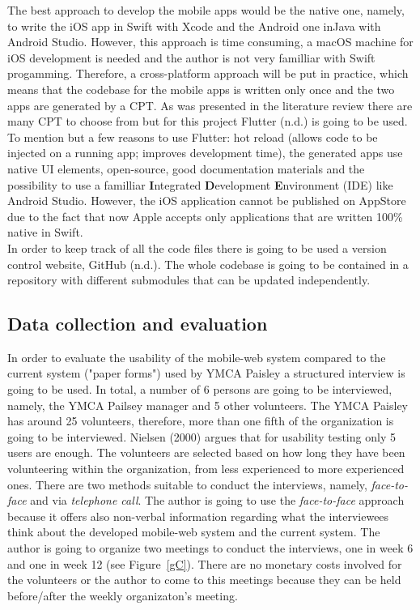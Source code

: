 \documentclass[version=last,fontsize=13pt]{scrartcl}
\begin{document}
	The best approach to develop the mobile apps would be the native one, namely, to write the iOS app in Swift with Xcode and the Android one inJava with Android Studio. However, this approach is time consuming, a macOS machine for iOS development is needed and the author is not very familliar with Swift progamming. Therefore, a cross-platform approach will be put in practice, which means that the codebase for the mobile apps is written only once and the two apps are generated by a CPT. As was presented in the literature review there are many CPT to choose from but for this project Flutter (n.d.) is going to be used. To mention but a few reasons to use Flutter: hot reload (allows code to be injected on a running app; improves development time), the generated apps use native UI elements, open-source, good documentation materials and the possibility to use a familliar \textbf{I}ntegrated \textbf{D}evelopment \textbf{E}nvironment (IDE) like Android Studio. However, the iOS application cannot be published on AppStore due to the fact that now Apple accepts only applications that are written 100\% native in Swift.\\
	\indent
	In order to keep track of all the code files there is going to  be used a version control website, GitHub (n.d.). The whole codebase is going to be contained in a repository with different submodules that can be updated independently. 
	

\subsection{Data collection and evaluation}
	In order to evaluate the usability of the mobile-web system compared to the current system ("paper forms") used by YMCA Paisley a structured interview is going to be used. In total, a number of 6 persons are going to be interviewed, namely, the YMCA Pailsey manager and 5 other volunteers. The YMCA Paisley has around 25 volunteers, therefore, more than one fifth of the organization is going to be interviewed. Nielsen (2000) argues that for usability testing  only 5 users are enough. The volunteers are selected based on how long they have been volunteering within the organization, from less experienced to more experienced ones. There are two methods suitable to conduct the interviews, namely, \textit{face-to-face} and via \textit{telephone call}. %
	The author is going to use the \textit{face-to-face} approach because it offers also non-verbal information regarding what the interviewees think about the developed mobile-web system and the current system.  The author is going to organize two meetings to conduct the interviews, one in week 6 and one in week 12 (see Figure~\ref{gC}). There are no monetary costs involved for the volunteers or the author to come to this meetings because they can be held before/after the weekly organizaton's meeting. %
\end{document}
